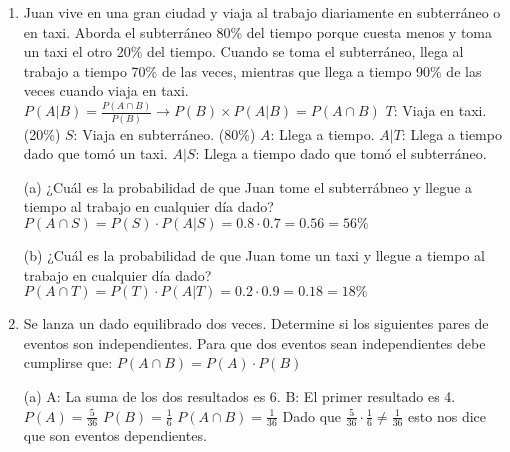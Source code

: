 \documentclass[a4paper, 12pt]{article}
\newcommand{\Pspace}{0.5cm}
\newcommand{\Aspace}{0.2cm}
\begin{document}
\begin{enumerate}
    \item Juan vive en una gran ciudad y viaja al trabajo diariamente en subterráneo o en taxi. Aborda el subterráneo 80\% del tiempo porque cuesta menos y toma un taxi el otro 20\% del tiempo. Cuando se toma el subterráneo, llega al trabajo a tiempo 70\% de las veces, mientras que llega a tiempo 90\% de las veces cuando viaja en taxi.
    \newline $P(A | B) = \frac{P(A \cap B)}{P(B)} \rightarrow P(B) \times P(A | B) = P(A \cap B)$
    \newline $T$: Viaja en taxi. (20\%)
    \newline $S$: Viaja en subterráneo. (80\%)
    \newline $A$: Llega a tiempo.
    \newline $A | T$: Llega a tiempo dado que tomó un taxi.
    \newline $A | S$: Llega a tiempo dado que tomó el subterráneo.
    \vspace{\Aspace} \par
    (a) ¿Cuál es la probabilidad de que Juan tome el subterrábneo y llegue a tiempo al trabajo en cualquier día dado?
    \\ { \color{azul} 
        $P(A \cap S) = P(S) \cdot P(A | S) = 0{.}8 \cdot 0{.}7 = 0{.}56 = 56\%$
    }

    \vspace{\Aspace}
    (b) ¿Cuál es la probabilidad de que Juan tome un taxi y llegue a tiempo al trabajo en cualquier día dado?
    \\ { \color{azul}  
        $P(A \cap T) = P(T) \cdot P(A | T) = 0{.}2 \cdot 0{.}9 = 0{.}18 = 18\%$    
    }


    \vspace{\Pspace}
    \item Se lanza un dado equilibrado dos veces. Determine si los siguientes pares de eventos son independientes.
    \newline Para que dos eventos sean independientes debe cumplirse que: 
    \newline $P(A \cap B) = P(A) \cdot P(B)$
    \vspace{\Aspace} \par
    (a) A: La suma de los dos resultados es 6. B: El primer resultado es 4.
    \\ { \color{azul} 
        $P(A) = \frac{5}{36}$
        \newline $P(B) = \frac{1}{6}$
        \newline $P(A \cap B) = \frac{1}{36}$
        \newline Dado que $\frac{5}{36} \cdot \frac{1}{6} \neq \frac{1}{36}$ esto nos dice que son eventos dependientes.
    }


\end{enumerate}
\end{document}
